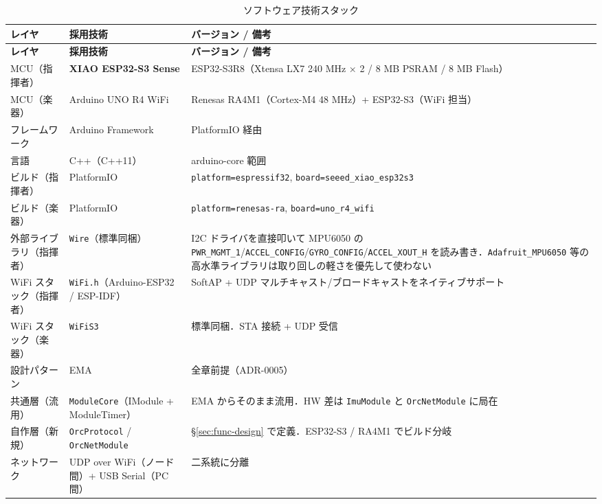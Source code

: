 \documentclass[lualatex,book,paper=a4paper,jafontsize=11.5pt,jafontscale=1.05]{jlreq}
\begin{document}
\begin{longtable}{p{} p{} p{}}
\caption{ソフトウェア技術スタック}\label{tab:sw-stack}\\
\toprule
\textbf{レイヤ} & \textbf{採用技術} & \textbf{バージョン / 備考} \\
\midrule
\endfirsthead
\toprule
\textbf{レイヤ} & \textbf{採用技術} & \textbf{バージョン / 備考} \\
\midrule
\endhead
MCU（指揮者）        & \textbf{XIAO ESP32-S3 Sense}  & ESP32-S3R8（Xtensa LX7 240 MHz × 2 / 8 MB PSRAM / 8 MB Flash） \\
MCU（楽器）          & Arduino UNO R4 WiFi          & Renesas RA4M1（Cortex-M4 48 MHz）+ ESP32-S3（WiFi 担当） \\
フレームワーク       & Arduino Framework            & PlatformIO 経由 \\
言語                 & C++（C++11）                 & arduino-core 範囲 \\
ビルド（指揮者）     & PlatformIO                   & \texttt{platform=espressif32}, \texttt{board=seeed\_xiao\_esp32s3} \\
ビルド（楽器）       & PlatformIO                   & \texttt{platform=renesas-ra}, \texttt{board=uno\_r4\_wifi} \\
外部ライブラリ（指揮者）& \texttt{Wire}（標準同梱） & I2C ドライバを直接叩いて MPU6050 の \texttt{PWR\_MGMT\_1}/\texttt{ACCEL\_CONFIG}/\texttt{GYRO\_CONFIG}/\texttt{ACCEL\_XOUT\_H} を読み書き．\texttt{Adafruit\_MPU6050} 等の高水準ライブラリは取り回しの軽さを優先して使わない \\
WiFi スタック（指揮者）& \texttt{WiFi.h}（Arduino-ESP32 / ESP-IDF）& SoftAP + UDP マルチキャスト/ブロードキャストをネイティブサポート \\
WiFi スタック（楽器）& \texttt{WiFiS3}              & 標準同梱．STA 接続 + UDP 受信 \\
設計パターン         & EMA                          & 全章前提（ADR-0005） \\
共通層（流用）       & \texttt{ModuleCore}（IModule + ModuleTimer） & EMA からそのまま流用．HW 差は \texttt{ImuModule} と \texttt{OrcNetModule} に局在 \\
自作層（新規）       & \texttt{OrcProtocol} / \texttt{OrcNetModule} & \S\ref{sec:func-design} で定義．ESP32-S3 / RA4M1 でビルド分岐 \\
ネットワーク         & UDP over WiFi（ノード間）+ USB Serial（PC 間） & 二系統に分離 \\
\bottomrule
\end{longtable}
\end{document}
